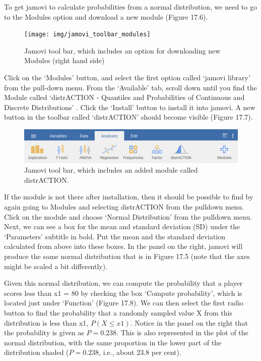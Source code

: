 \documentclass[
]{scrbook}
\begin{document}
To get jamovi to calculate probabilities from a normal distribution, we need to go to the Modules option and download a new module (Figure 17.6).

\begin{figure}
\texttt{[image: img/jamovi\_toolbar\_modules]} \caption{Jamovi tool bar, which includes an option for downloading new Modules (right hand side)}\label{fig:unnamed-chunk-76}
\end{figure}

Click on the `Modules' button, and select the first option called `jamovi library' from the pull-down menu.
From the `Available' tab, scroll down until you find the Module called `distrACTION - Quantiles and Probabilities of Continuous and Discrete Distributions' \citep{Rihs2018}.
Click the `Install' button to install it into jamovi.
A new button in the toolbar called `distrACTION' should become visible (Figure 17.7).

\begin{figure}
\includegraphics[width=1\linewidth]{img/jamovi_toolbar_modules_distrACTION} \caption{Jamovi tool bar, which includes an added module called distrACTION.}\label{fig:unnamed-chunk-77}
\end{figure}

If the module is not there after installation, then it should be possible to find by again going to Modules and selecting distrACTION from the pulldown menu.
Click on the module and choose `Normal Distribution' from the pulldown menu.
Next, we can see a box for the mean and standard deviation (SD) under the `Parameters' subtitle in bold.
Put the mean and the standard deviation calculated from above into these boxes.
In the panel on the right, jamovi will produce the same normal distribution that is in Figure 17.5 (note that the axes might be scaled a bit differently).

Given this normal distribution, we can compute the probability that a player scores less than x1 = 80 by checking the box `Compute probability', which is located just under `Function' (Figure 17.8).
We can then select the first radio button to find the probability that a randomly sampled value X from this distribution is less than x1, \(P(X \leq x1)\).
Notice in the panel on the right that the probability is given as \(P = 0.238\).
This is also represented in the plot of the normal distribution, with the same proportion in the lower part of the distribution shaded (\(P = 0.238\), i.e., about 23.8 per cent).
\end{document}
